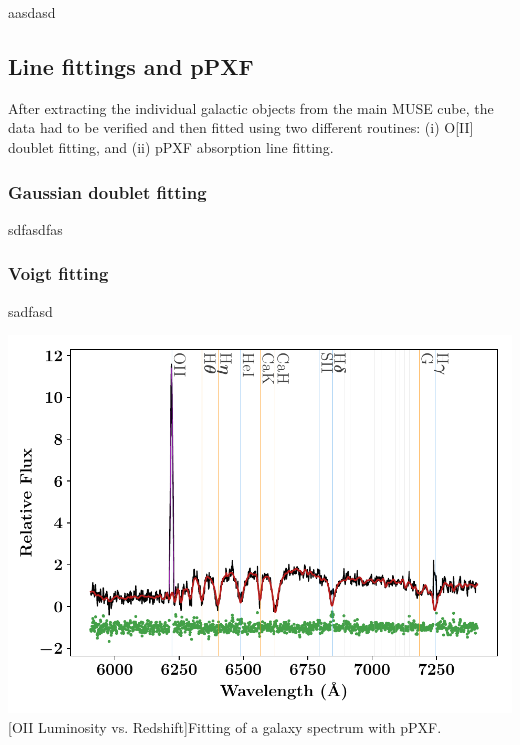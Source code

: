 \documentclass[12pt, twocolumn]{revtex4}    %
\begin{document}
aasdasd

\subsection{Line fittings and pPXF} 

After extracting the individual galactic objects from the main MUSE cube, the data had to be verified and then fitted using two different routines: (i) O[II] doublet fitting, and (ii) pPXF absorption line fitting. 

\subsubsection{Gaussian doublet fitting}

sdfasdfas

\subsubsection{Voigt fitting}

sadfasd

\begin{center}
\includegraphics[width=1.0\linewidth]{data/cube_1804_fitted}
[OII Luminosity vs. Redshift]{Fitting of a galaxy spectrum with pPXF.}
\label{fig:oiiluminosity_redshift}
\end{center}
\end{document}
